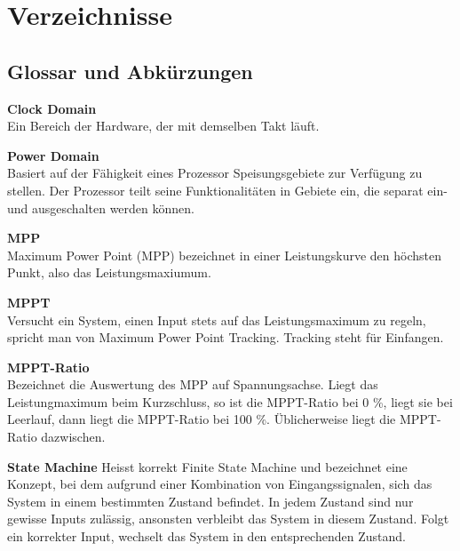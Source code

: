 \chapter{Verzeichnisse}




\renewcommand{\bibsection}{\section{\refname}}  %
\makeatletter
\makeatother






\section{Glossar und Abkürzungen}\label{glossar}

\textbf{Clock Domain}\\
Ein Bereich der Hardware, der mit demselben Takt läuft.

\textbf{Power Domain}\\
Basiert auf der Fähigkeit eines Prozessor Speisungsgebiete zur Verfügung zu stellen. Der Prozessor teilt seine Funktionalitäten in Gebiete ein, die separat ein- und ausgeschalten werden können.

\textbf{MPP}\\
Maximum Power Point (MPP) bezeichnet in einer Leistungskurve den höchsten Punkt, also das Leistungsmaxiumum.

\textbf{MPPT}\\
Versucht ein System, einen Input stets auf das Leistungsmaximum zu regeln, spricht man von Maximum Power Point Tracking. Tracking steht für Einfangen.

\textbf{MPPT-Ratio}\\
Bezeichnet die Auswertung des MPP auf Spannungsachse. Liegt das Leistungmaximum beim Kurzschluss, so ist die MPPT-Ratio bei 0 \%, liegt sie bei Leerlauf, dann liegt die MPPT-Ratio bei 100 \%. Üblicherweise liegt die MPPT-Ratio dazwischen.

\textbf{State Machine}
Heisst korrekt Finite State Machine und bezeichnet eine Konzept, bei dem aufgrund einer Kombination von Eingangssignalen, sich das System in einem bestimmten Zustand befindet. In jedem Zustand sind nur gewisse Inputs zulässig, ansonsten verbleibt das System in diesem Zustand. Folgt ein korrekter Input, wechselt das System in den entsprechenden Zustand. 



